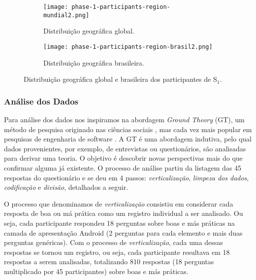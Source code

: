 \begin{figure*}[!htb]
\centering
\begin{subfigure}{.52\textwidth}
  \centering
  \texttt{[image: phase-1-participants-region-mundial2.png]}
  \caption{Distribuição geográfica global.}
  \label{fig:phase1-participants-regions-global}
\end{subfigure}
\begin{subfigure}{.46\textwidth}
  \centering
  \texttt{[image: phase-1-participants-region-brasil2.png]}
  \caption{Distribuição geográfica brasileira.}
  \label{fig:phase1-participants-regions-brasil}
\end{subfigure}%
\caption{Distribuição geográfica global e brasileira dos participantes de S$_1$.}
\label{fig:phase1-participants-regions}
\vspace{-.5cm} 
\end{figure*}



\subsubsection{Análise dos Dados}
\label{etapa-1-analise}

Para análise dos dados nos inspiramos na abordagem \textit{Ground Theory} (GT), um método de pesquisa originado nas ciências sociais \cite{Strauss2007, GlaserStrauss1999}, mas cada vez mais popular em pesquisas de engenharia de software \cite{Adolph2011}. A GT é uma abordagem indutiva, pelo qual dados provenientes, por exemplo, de entrevistas ou questionários, são analisadas para derivar uma teoria. O objetivo é descobrir novas perspectivas mais do que confirmar alguma já existente. O processo de análise partiu da listagem das 45 respostas do questionário e se deu em 4 passos: \textit{verticalização}, \textit{limpeza dos dados}, \textit{codificação} e \textit{divisão}, detalhados a seguir.

O processo que denominamos de \textit{verticalização} consistiu em considerar cada resposta de boa ou má prática como um registro individual a ser analisado. Ou seja, cada participante respondeu 18 perguntas sobre boas e más práticas na camada de apresentação Android (2 perguntas para cada elemento e mais duas perguntas genéricas). Com o processo de \textit{verticalização}, cada uma dessas respostas se tornou um registro, ou seja, cada participante resultava em 18 respostas a serem analisadas, totalizando 810 respostas (18 perguntas multiplicado por 45 participantes) sobre boas e más práticas.

